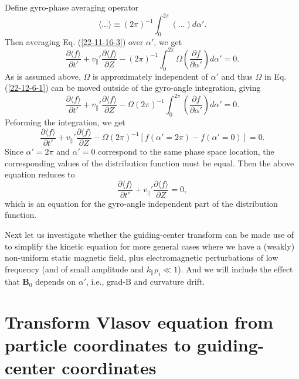 \documentclass{article}
\begin{document}
Define gyro-phase averaging operator
\begin{equation}
  \langle \ldots \rangle \equiv (2 \pi)^{- 1} \int_0^{2 \pi} (\ldots) d
  \alpha' .
\end{equation}
Then averaging Eq. (\ref{22-11-16-3}) over $\alpha'$, we get
\begin{equation}
  \label{22-12-6-1} \frac{\partial \langle f \rangle}{\partial t'} +
  v_{\parallel}' \frac{\partial \langle f \rangle}{\partial Z} - (2 \pi)^{- 1}
  \int_0^{2 \pi} \Omega \left( \frac{\partial f}{\partial \alpha'} \right) d
  \alpha' = 0.
\end{equation}
As is assumed above, $\Omega$ is approximately independent of $\alpha'$ and
thus $\Omega$ in Eq. (\ref{22-12-6-1}) can be moved outside of the gyro-angle
integration, giving
\begin{equation}
  \frac{\partial \langle f \rangle}{\partial t'} + v_{\parallel}'
  \frac{\partial \langle f \rangle}{\partial Z} - \Omega (2 \pi)^{- 1}
  \int_0^{2 \pi} \left( \frac{\partial f}{\partial \alpha'} \right) d \alpha'
  = 0.
\end{equation}
Peforming the integration, we get
\begin{equation}
  \frac{\partial \langle f \rangle}{\partial t'} + v_{\parallel}'
  \frac{\partial \langle f \rangle}{\partial Z} - \Omega (2 \pi)^{- 1} [f
  (\alpha' = 2 \pi) - f (\alpha' = 0)] = 0.
\end{equation}
Since $\alpha' = 2 \pi$ and $\alpha' = 0$ correspond to the same phase space
location, the corresponding values of the distribution function must be equal.
Then the above equation reduces to
\begin{equation}
  \frac{\partial \langle f \rangle}{\partial t'} + v_{\parallel}'
  \frac{\partial \langle f \rangle}{\partial Z} = 0,
\end{equation}
which is an equation for the gyro-angle independent part of the distribution
function.

Next let us investigate whether the guiding-center transform can be made use
of to simplify the kinetic equation for more general cases where we have a
(weakly) non-uniform static magnetic field, plus electromagnetic perturbations
of low frequency (and of small amplitude and $k_{\parallel} \rho_i \ll 1$).
And we will include the effect that $\mathbf{B}_0$ depends on $\alpha'$, i.e.,
grad-B and curvature drift.

\section{Transform Vlasov equation from particle coordinates to guiding-center
coordinates}
\end{document}
